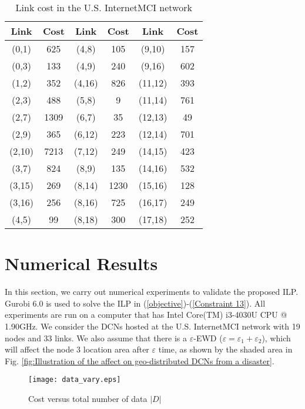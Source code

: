 \documentclass[conference]{IEEEtran}\IEEEoverridecommandlockouts
\begin{document}
\begin{table}[t]
\centering \caption{\label{Link} Link cost in the  U.S. InternetMCI network}
\begin{tabular}{|c|c|c|c|c|c|}
\hline
Link & Cost & Link &Cost  & Link &Cost\\
\hline
(0,1) &625 &(4,8) &105&(9,10) &157\\
\hline
(0,3) &133 &(4,9) &240&(9,16) &602\\
\hline
(1,2) &352 &(4,16) &826&(11,12) &393\\
\hline
(2,3) &488 &(5,8) &9&(11,14) &761\\
\hline
(2,7) &1309 &(6,7) &35&(12,13) &49\\
\hline
(2,9) &365 &(6,12) &223&(12,14) &701\\
\hline
(2,10) &7213&(7,12) &249&(14,15) &423\\
\hline
(3,7) &824&(8,9) &135&(14,16) &532\\
\hline
(3,15) &269&(8,14) &1230&(15,16) &128\\
\hline
(3,16) &256&(8,16) &725&(16,17) &249\\
\hline
(4,5) &99&(8,18) &300&(17,18) &252\\

\hline
\end{tabular}
\end{table}




\section{Numerical Results}\label{Numerical results}
In this section, we carry out  numerical experiments to validate the proposed ILP. Gurobi 6.0 is used to solve the ILP in (\ref{objective})-(\ref{Constraint 13}). All experiments are run on a computer that has Intel Core(TM) i3-4030U CPU @ 1.90GHz. We consider the DCNs hosted at the U.S. InternetMCI network with 19 nodes and 33 links. We also assume that there is a  $\varepsilon$-EWD ($\varepsilon=\varepsilon_{1}+\varepsilon_{2}$), which will affect the node 3 location area after $\varepsilon$ time, as shown by the shaded area in Fig. \ref{fig:Illustration of the affect on geo-distributed DCNs from a disaster}.


\begin{figure}[t]
      \centering
      \texttt{[image: data\_vary.eps]}
   \caption{Cost versus total number of data $|D|$}
   \label{fig:Cost versus total number of data}
  \end{figure}
\end{document}
